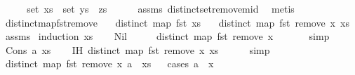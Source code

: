 \begin{isabellebody}
\ \ \isamarkupfalse%
\ \isamarkupfalse%
\ {\isachardoublequoteopen}set\ xs\ {\isacharequal}\ set\ {\isacharparenleft}ys\ {\isacharat}\ zs{\isacharparenright}{\isachardoublequoteclose}\isanewline
\ \ \ \ \isamarkupfalse%
\ assms\ distinct{\isacharunderscore}set{\isacharunderscore}remove{\isacharunderscore}mid\ \isamarkupfalse%
\ metis\isanewline
{}\isamarkupfalse%
%
\endisatagproof
{\isafoldproof}%
%
\isadelimproof
\isanewline
%
\endisadelimproof
\isanewline
{}\isamarkupfalse%
\ distinct{\isacharunderscore}map{\isacharunderscore}fst{\isacharunderscore}remove{}{\isacharcolon}\isanewline
\ \ \ {\isachardoublequoteopen}distinct\ {\isacharparenleft}map\ fst\ xs{\isacharparenright}{\isachardoublequoteclose}\isanewline
\ \ \ {\isachardoublequoteopen}distinct\ {\isacharparenleft}map\ fst\ {\isacharparenleft}remove{}\ x\ xs{\isacharparenright}{\isacharparenright}{\isachardoublequoteclose}\isanewline
%
\isadelimproof
%
\endisadelimproof
%
\isatagproof
{}\isamarkupfalse%
\ assms\ \isamarkupfalse%
{\isacharparenleft}induction\ xs{\isacharparenright}\isanewline
\ \ \isamarkupfalse%
\ Nil\isanewline
\ \ \isamarkupfalse%
\ \isamarkupfalse%
\ {\isachardoublequoteopen}distinct\ {\isacharparenleft}map\ fst\ {\isacharparenleft}remove{}\ x\ {\isacharbrackleft}{\isacharbrackright}{\isacharparenright}{\isacharparenright}{\isachardoublequoteclose}\isanewline
\ \ \ \ \isamarkupfalse%
\ simp\isanewline
{}\isamarkupfalse%
\isanewline
\ \ \isamarkupfalse%
\ {\isacharparenleft}Cons\ a\ xs{\isacharparenright}\isanewline
\ \ \isamarkupfalse%
\ IH{\isacharcolon}\ {\isachardoublequoteopen}distinct\ {\isacharparenleft}map\ fst\ {\isacharparenleft}remove{}\ x\ xs{\isacharparenright}{\isacharparenright}{\isachardoublequoteclose}\isanewline
\ \ \ \ \isamarkupfalse%
\ simp\isanewline
\ \ \isamarkupfalse%
\ \isamarkupfalse%
\ {\isachardoublequoteopen}distinct\ {\isacharparenleft}map\ fst\ {\isacharparenleft}remove{}\ x\ {\isacharparenleft}a\ {\isacharhash}\ xs{\isacharparenright}{\isacharparenright}{\isacharparenright}{\isachardoublequoteclose}\isanewline
\ \ \isamarkupfalse%
{\isacharparenleft}cases\ {\isachardoublequoteopen}a\ {\isacharequal}\ x{\isachardoublequoteclose}{\isacharparenright}\isanewline

\end{isabellebody}
